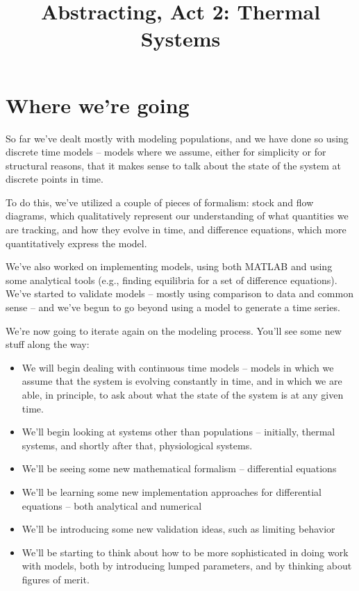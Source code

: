 \documentclass[10pt]{book}
\begin{document}
\title{Abstracting, Act 2: Thermal Systems}

\section{Where we're going}

So far we've dealt mostly with modeling populations, and we have done so using discrete time models -- models where we assume, either for simplicity or for structural reasons, that it makes sense to talk about the state of the system at discrete points in time.  

To do this, we've utilized a couple of pieces of formalism: stock and flow diagrams, which qualitatively represent our understanding of what quantities we are tracking, and how they evolve in time, and difference equations, which more quantitatively express the model. 

We've also worked on implementing models, using both MATLAB and using some analytical tools (e.g., finding equilibria for a set of difference equations). We've started to validate models -- mostly using comparison to data and common sense -- and we've begun to go beyond using a model to generate a time series.

We're now going to iterate again on the modeling process.  You'll see some new stuff along the way:

\begin{itemize}
\item We will begin dealing with continuous time models -- models in which we assume that the system is evolving constantly in time, and in which we are able, in principle, to ask about what the state of the system is at any given time.
\item We'll begin looking at systems other than populations -- initially, thermal systems, and shortly after that, physiological systems.
\item We'll be seeing some new mathematical formalism -- differential equations
\item We'll be learning some new implementation approaches for differential equations -- both analytical and numerical
\item We'll be introducing some new validation ideas, such as limiting behavior
\item We'll be starting to think about how to be more sophisticated in doing work with models, both by introducing lumped parameters, and by thinking about figures of merit.
\end{itemize}
\end{document}
